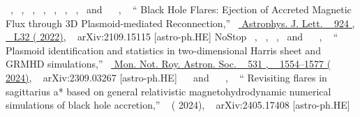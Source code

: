 \documentclass[aps,reprint,superscriptaddress,nofootinbib,floatfix,longbibliography,preprintnumbers]{revtex4-1}
\begin{document}
\begin{thebibliography}{139}
  \BibitemOpen
   { { \  },  { \  },  { \  },  { \  },  { \  },  { \  },  { \  },  \  and \   { \  }, \  } {\enquote { {{Black Hole Flares: Ejection of Accreted Magnetic Flux through 3D Plasmoid-mediated Reconnection}},} \  }\href {\doibase 10.3847/2041-8213/ac46a1} { { {Astrophys. J. Lett.} \  }  {924} , \   {L32} ( {2022})}, \   {arXiv:2109.15115 [astro-ph.HE]} \BibitemShut
  {NoStop}
  \BibitemOpen
   { { \  },  { \  },  { \  },  \  and \   { \  }, \  } {\enquote { {{Plasmoid identification and statistics in two-dimensional Harris sheet and GRMHD simulations}},} \  }\href {\doibase 10.1093/mnras/stae1046} { { {Mon. Not. Roy. Astron. Soc.} \  }  {531} , \   {1554--1577} ( {2024})}, \   {arXiv:2309.03267 [astro-ph.HE]} 
  \BibitemOpen
   { { \  } \  and \   { \  }, \  }\href@noop {} {\enquote { {Revisiting flares in sagittarius a* based on general relativistic magnetohydrodynamic numerical simulations of black hole accretion},} \  } ( {2024}), \   {arXiv:2405.17408 [astro-ph.HE]} 

\end{thebibliography}
\end{document}
